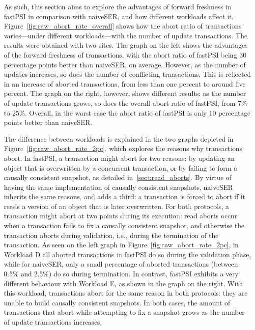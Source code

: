As such, this section aims to explore the advantages of forward freshness in fastPSI in comparison with naiveSER, and how different workloads affect it. Figure~\ref{fig:raw_abort_rate_overall} shows how the abort ratio of transactions varies---under different workloads---with the number of update transactions. The results were obtained with two sites. The graph on the left shows the advantages of the forward freshness of transactions, with the abort ratio of fastPSI being 30 percentage points better than naiveSER, on average. However, as the number of updates increases, so does the number of conflicting transactions. This is reflected in an increase of aborted transactions, from less than one percent to around five percent. The graph on the right, however, shows different results: as the number of update transactions grows, so does the overall abort ratio of fastPSI, from 7\% to 25\%. Overall, in the worst case the abort ratio of fastPSI is only 10 percentage points better than naiveSER.

The difference between workloads is explained in the two graphs depicted in Figure~\ref{fig:raw_abort_rate_2pc}, which explores the reasons why transactions abort. In fastPSI, a transaction might abort for two reasons: by updating an object that is overwritten by a concurrent transaction, or by failing to form a causally consistent snapshot, as detailed in~\ref{sect:read_aborts}. By virtue of having the same implementation of causally consistent snapshots, naiveSER inherits the same reasons, and adds a third: a transaction is forced to abort if it reads a version of an object that is later overwritten. For both protocols, a transaction might abort at two points during its execution: read aborts occur when a transaction fails to fix a causally consistent snapshot, and otherwise the transaction aborts during validation, i.e., during the termination of the transaction. As seen on the left graph in Figure~\ref{fig:raw_abort_rate_2pc}, in Workload D all aborted transactions in fastPSI do so during the validation phase, while for naiveSER, only a small percentage of aborted transactions (between 0.5\% and 2.5\%) do so during termination. In contrast, fastPSI exhibits a very different behaviour with Workload E, as shown in the graph on the right. With this workload, transactions abort for the same reason in both protocols: they are unable to build causally consistent snapshots. In both cases, the amount of transactions that abort while attempting to fix a snapshot grows as the number of update transactions increases.

